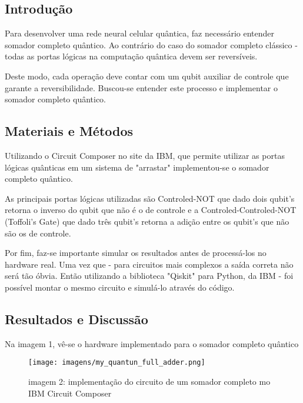 \documentclass[12pt, a4paper]{article} %
\begin{document}
    \subsection{Introdução}
    
        Para desenvolver uma rede neural celular qu\^antica, faz necess\'ario entender somador completo qu\^antico. Ao contrário do caso do somador completo cl\'assico - todas as portas l\'ogicas na computa\c{c}\~ao qu\^antica devem ser revers\'iveis.
    
        Deste modo, cada opera\c{c}\~ao deve contar com um qubit auxiliar de controle que garante a reversibilidade. Buscou-se entender este processo e implementar o somador completo qu\^antico.
    
    \subsection{Materiais e Métodos}
    
        Utilizando o Circuit Composer no site da IBM, que permite utilizar as portas l\'ogicas qu\^anticas em um sistema de "arrastar" implementou-se o somador completo qu\^antico.
    
        As principais portas l\'ogicas utilizadas s\~ao Controled-NOT que dado dois qubit's retorna o inverso do qubit que n\~ao \'e o de controle e a Controled-Controled-NOT (Toffoli's Gate) que dado tr\^es qubit's retorna a adi\c{c}\~ao entre os qubit's que n\~ao s\~ao os de controle.

        Por fim, faz-se importante simular os resultados antes de process\'a-los no hardware real. Uma vez que - para circuitos mais complexos a sa\'ida correta n\~ao ser\'a t\~ao \'obvia. Ent\~ao utilizando a biblioteca "Qiskit" para Python, da IBM - foi poss\'ivel montar o mesmo circuito e simul\'a-lo atrav\'es do c\'odigo.
    
    \subsection{Resultados e Discussão}
    
        Na imagem 1, v\^e-se o hardware implementado para o somador completo 
        qu\^antico
    
        \begin{figure}[H]
        
        \centering
        
        \texttt{[image: imagens/my\_quantun\_full\_adder.png]}
        
        imagem 2: implementa\c{c}\~ao do circuito de um somador completo mo IBM Circuit Composer
        
        \end{figure}
    
\end{document}
